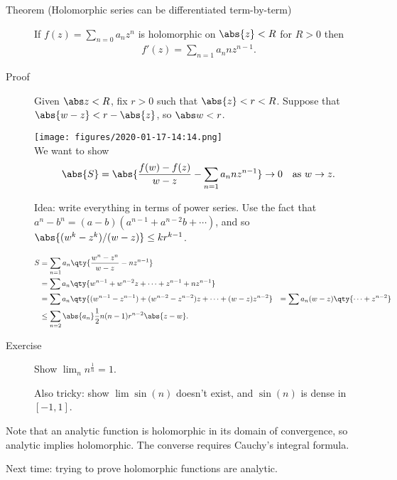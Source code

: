 \begin{description}
\item[Theorem (Holomorphic series can be differentiated term-by-term)]
If \(f(z) = \sum_{n=0} a_n z^n\) is holomorphic on \(\abs{z} < R\) for
\(R> 0\) then
\begin{align*}f'(z) = \sum_{n=1} a_n n z^{n-1}.\end{align*}
\item[Proof]
Given \(\abs z < R\), fix \(r>0\) such that \(\abs {z} < r < R\).
Suppose that \(\abs{w-z} < r - \abs{z}\), so \(\abs w < r\).

\texttt{[image: figures/2020-01-17-14:14.png]}\\

We want to show \begin{align*}
\abs{S} = \abs{\frac{f(w) - f(z)}{w - z} - \sum_{n=1} a_n n z^{n-1}} \to 0 \quad \text{as } w\to z
.\end{align*}

Idea: write everything in terms of power series. Use the fact that
\(a^n - b^n = (a-b)(a^{n-1} + a^{n-2}b + \cdots)\), and so
\(\abs{(w^k-z^k)/(w-z)} \leq k r^{k-1}\).

\begin{align*}
S 
&= \sum_{n=1} a_n \qty{ \frac{w^n - z^n}{w-z} - n z^{n-1}  } \\
&= \sum a_n \qty{ w^{n-1} + w^{n-2}z + \cdots + z^{n-1} + nz^{n-1} } \\
&=  \sum a_n \qty{ (w^{n-1} - z^{n-1}) + (w^{n-2} - z^{n-2})z + \cdots + (w-z) z^{n-2} }
&= \sum a_n (w-z) \qty{ \cdots + z^{n-2} }\\
&\leq \sum_{n=2} \abs{a_n} \frac 1 2 n(n-1) r^{n-2} \abs{z-w}
.\end{align*}
\item[Exercise]
Show \(\lim_n n^{\frac 1 n} = 1\).

Also tricky: show \(\lim \sin(n)\) doesn't exist, and \(\sin(n)\) is
dense in \([-1, 1]\).

\end{description}

Note that an analytic function is holomorphic in its domain of
convergence, so analytic implies holomorphic. The converse requires
Cauchy's integral formula.

Next time: trying to prove holomorphic functions are analytic.

